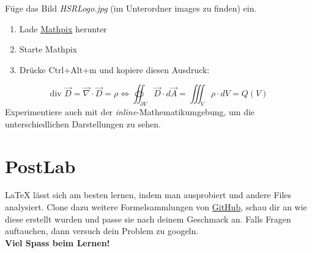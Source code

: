	\begin{aufgabe}
	Füge das Bild \textit{\glqq HSRLogo.jpg\grqq} (im Unterordner images zu finden) ein.
	\end{aufgabe}

	\begin{aufgabe}
	\begin{enumerate}
		\item Lade \href{https://mathpix.com}{Mathpix} herunter
		\item Starte Mathpix
		\item Drücke Ctrl+Alt+m und kopiere diesen Ausdruck:
	\end{enumerate}

	\[ \text{div } \vec{D} = \vec{\nabla} \cdot \vec{D} = \rho \Leftrightarrow \oiint_{\partial V}\vec{D}\cdot d\vec{A} = \iiint_V \rho \cdot dV = Q(V) \]
	Experimentiere auch mit der \textit{inline}-Mathematikumgebung, um die unterschiedlichen Darstellungen zu sehen. 
	\end{aufgabe}
	

\section{PostLab}

	\begin{aufgabe}[Ausprobieren!]
	\LaTeX{} lässt sich am besten lernen, indem man ausprobiert und andere Files analysiert. Clone dazu weitere Formelsammlungen von {\color{blue}\href{https://github.com/HSR-Stud/VorlageZFLaTex}{GitHub}}, schau dir an wie diese erstellt wurden und passe sie nach deinem Geschmack an. Falls Fragen auftauchen, dann versuch dein Problem zu googeln.\vspace{6pt}\\
	\textbf{\large Viel Spass beim Lernen! %
	}
\end{aufgabe}